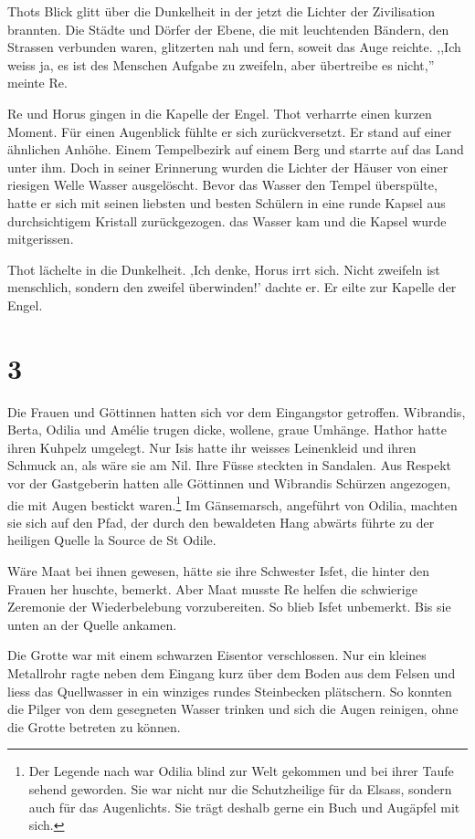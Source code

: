 \documentclass[11pt,titlepage,a5paper]{book}
\newcommand{\am}{Amélie }
\begin{document}
Thots Blick glitt über die Dunkelheit in der jetzt die Lichter der Zivilisation brannten. Die Städte und Dörfer der Ebene, die mit leuchtenden Bändern, den Strassen verbunden waren, glitzerten nah und fern, soweit das Auge reichte. ,,Ich weiss ja, es ist des Menschen Aufgabe zu zweifeln, aber übertreibe es nicht,'' meinte Re.

Re und Horus gingen in die Kapelle der Engel. Thot verharrte einen kurzen Moment. Für einen Augenblick fühlte er sich zurückversetzt. Er stand auf einer ähnlichen Anhöhe. Einem Tempelbezirk auf einem Berg und starrte auf das Land unter ihm. Doch in seiner Erinnerung wurden die Lichter der Häuser von einer riesigen Welle Wasser ausgelöscht. Bevor das Wasser den Tempel überspülte, hatte er sich mit seinen liebsten und besten Schülern in eine runde Kapsel aus durchsichtigem Kristall zurückgezogen. das Wasser kam und die Kapsel wurde mitgerissen. 

Thot lächelte in die Dunkelheit. ,Ich denke, Horus irrt sich. Nicht zweifeln ist menschlich, sondern den zweifel überwinden!' dachte er. Er eilte zur Kapelle der Engel.

\section*{3}

Die Frauen und Göttinnen hatten sich vor dem Eingangstor getroffen. Wibrandis, Berta, Odilia und \am trugen dicke, wollene, graue Umhänge. Hathor hatte ihren Kuhpelz umgelegt. Nur Isis hatte ihr weisses Leinenkleid und ihren Schmuck an, als wäre sie am Nil. Ihre Füsse steckten in Sandalen. Aus Respekt vor der Gastgeberin hatten alle Göttinnen und Wibrandis Schürzen angezogen, die mit Augen bestickt waren.\footnote{Der Legende nach war Odilia blind zur Welt gekommen und bei ihrer Taufe sehend geworden. Sie war nicht nur die Schutzheilige für da Elsass, sondern auch für das Augenlichts. Sie trägt deshalb gerne ein Buch und Augäpfel mit sich.} Im Gänsemarsch, angeführt von Odilia, machten sie sich auf den Pfad, der durch den bewaldeten Hang abwärts führte zu der heiligen Quelle la Source de St Odile.

Wäre Maat bei ihnen gewesen, hätte sie ihre Schwester Isfet, die hinter den Frauen her huschte, bemerkt. Aber Maat musste Re helfen die schwierige Zeremonie der Wiederbelebung vorzubereiten. So blieb Isfet unbemerkt. Bis sie unten an der Quelle ankamen. 

Die Grotte war mit einem schwarzen Eisentor verschlossen. Nur ein kleines Metallrohr ragte neben dem Eingang kurz über dem Boden aus dem Felsen und liess das Quellwasser in ein winziges rundes Steinbecken plätschern. So konnten die Pilger von dem gesegneten Wasser trinken und sich die Augen reinigen, ohne die Grotte betreten zu können. 
\end{document}
